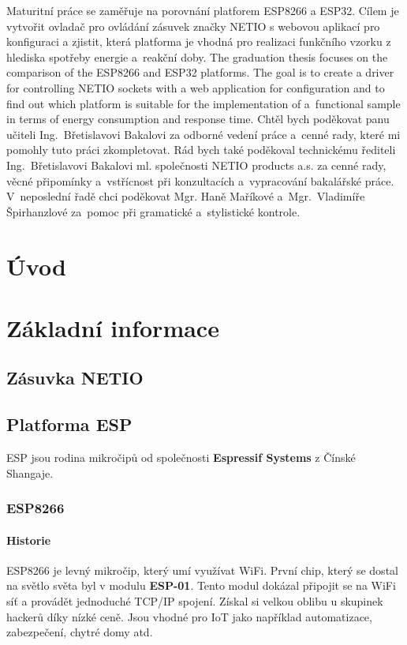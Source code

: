 \documentclass[a4paper, 12pt]{report}
\begin{document}
	\titulniStrana
	\anotace
		Maturitní práce se zaměřuje na porovnání platforem ESP8266 a ESP32. Cílem je vytvořit ovladač pro ovládání zásuvek značky NETIO s webovou aplikací pro konfiguraci a zjistit, která platforma je vhodná pro realizaci funkčního vzorku z hlediska spotřeby energie a~reakční doby.
	\annotation
		The graduation thesis focuses on the comparison of the ESP8266 and ESP32 platforms. The goal is to create a driver for controlling NETIO sockets with a web application for configuration and to find out which platform is suitable for the implementation of a~functional sample in terms of energy consumption and response time.
	\podekovani
		Chtěl bych poděkovat panu učiteli Ing.~Břetislavovi Bakalovi za odborné vedení práce a~cenné rady, které mi pomohly tuto práci zkompletovat. Rád bych také poděkoval  technickému řediteli Ing.~Břetislavovi Bakalovi ml. společnosti NETIO products a.s. za cenné rady, věcné připomínky a~vstřícnost při konzultacích a~vypracování bakalářské práce. V~neposlední řadě chci poděkovat Mgr. Haně Maříkové a~Mgr.~Vladimíře Špirhanzlové za~pomoc při gramatické a~stylistické kontrole.
	\tableofcontents

	\chapter{Úvod}
	\chapter{Základní informace}

		\section{Zásuvka NETIO}

		\section{Platforma ESP}
			ESP jsou rodina mikročipů od společnosti \textbf{Espressif Systems} z Čínské Shangaje.
			\subsection{ESP8266}

				\subsubsection{Historie}
					ESP8266 je levný mikročip, který umí využívat WiFi. První chip, který se dostal na světlo světa byl v modulu \textbf{ESP-01}. Tento modul dokázal připojit se na WiFi síť a provádět jednoduché TCP/IP spojení. Získal si velkou oblibu u skupinek hackerů díky nízké ceně. Jsou vhodné pro IoT jako například automatizace, zabezpečení, chytré domy atd.
\end{document}
